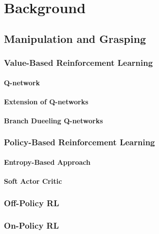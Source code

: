 
\chapter{Background}\label{chapter:background}
\section{Manipulation and Grasping}

    
    
    
    \subsection{Value-Based Reinforcement Learning}
        \subsubsection{Q-network}
        \subsubsection{Extension of Q-networks}
        \subsubsection{Branch Dueeling Q-networks}
    \subsection{Policy-Based Reinforcement Learning}
        \subsubsection{Entropy-Based Approach}
        \subsubsection{Soft Actor Critic}
    \subsection{Off-Policy RL}
    \subsection{On-Policy RL}


